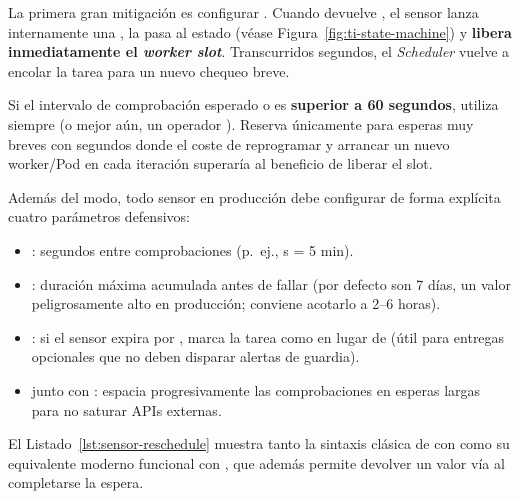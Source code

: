 La primera gran mitigación es configurar \textbf{}. Cuando  devuelve , el sensor lanza internamente una , la  pasa al estado  (véase Figura~\ref{fig:ti-state-machine}) y \textbf{libera inmediatamente el \textit{worker slot}}. Transcurridos  segundos, el \textit{Scheduler} vuelve a encolar la tarea para un nuevo chequeo breve.

\begin{infobox}
Si el intervalo de comprobación esperado o  es \textbf{superior a 60 segundos}, utiliza siempre  (o mejor aún, un operador ). Reserva  únicamente para esperas muy breves con  segundos donde el coste de reprogramar y arrancar un nuevo worker/Pod en cada iteración superaría al beneficio de liberar el slot.
\end{infobox}

Además del modo, todo sensor en producción debe configurar de forma explícita cuatro parámetros defensivos:
\begin{itemize}
  \item {}: segundos entre comprobaciones (p.~ej.,  s = 5 min).
  \item {}: duración máxima acumulada antes de fallar (por defecto son 7 días, un valor peligrosamente alto en producción; conviene acotarlo a 2--6 horas).
  \item {}: si el sensor expira por , marca la tarea como  en lugar de  (útil para entregas opcionales que no deben disparar alertas de guardia).
  \item {} junto con : espacia progresivamente las comprobaciones en esperas largas para no saturar APIs externas.
\end{itemize}

El Listado~\ref{lst:sensor-reschedule} muestra tanto la sintaxis clásica de  con  como su equivalente moderno funcional con , que además permite devolver un valor vía  al completarse la espera.

